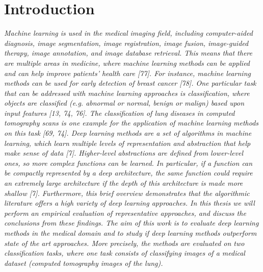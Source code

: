 \chapter{Introduction}


\textit{Machine learning is used in the medical imaging field, including computer-aided diagnosis, image segmentation, image registration, image fusion, image-guided therapy, image annotation,
and image database retrieval. This means that there are multiple areas in medicine, where
machine learning methods can be applied and can help improve patients’ health care [77].
For instance, machine learning methods can be used for early detection of breast cancer [78].
One particular task that can be addressed with machine learning approaches is classification,
where objects are classified (e.g. abnormal or normal, benign or malign) based upon input features [13, 74, 76]. The classification of lung diseases in computed tomography scans is one
example for the application of machine learning methods on this task [69, 74].
Deep learning methods are a set of algorithms in machine learning, which learn multiple
levels of representation and abstraction that help make sense of data [7]. Higher-level abstractions are defined from lower-level ones, so more complex functions can be learned. In particular,
if a function can be compactly represented by a deep architecture, the same function could require an extremely large architecture if the depth of this architecture is made more shallow [7].
Furthermore, this brief overview demonstrates that the algorithmic literature offers a high variety of deep learning approaches. In this thesis we will perform an empirical evaluation of
representative approaches, and discuss the conclusions from these findings. The aim of this work is to evaluate deep learning methods in the medical domain and to study if
deep learning methods outperform state of the art approaches. More precisely, the methods are
evaluated on two classification tasks, where one task consists of classifying images of a medical dataset (computed tomography images of the lung).}



